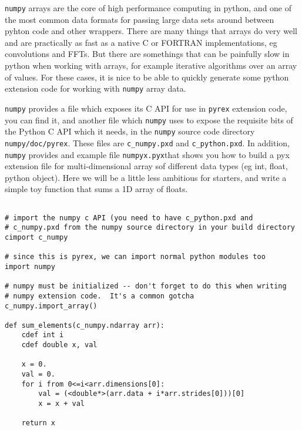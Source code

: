 \texttt{numpy} arrays are the core of high performance computing in
python, and one of the most common data formats for passing large data
sets around between pyhton code and other wrappers.  There are many
things that arrays do very well and are practically as fast as a
native C or FORTRAN implementations, eg convolutions and FFTs.  But
there are somethings that can be painfully slow in python when working
with arrays, for example iterative algorithms over an array of values.
For these cases, it is nice to be able to quickly generate some python
extension code for working with \texttt{numpy} array data.

\texttt{numpy} provides a file which exposes its C API for use in
\texttt{pyrex} extension code, you can find it, and another file which
\texttt{numpy} uses to expose the requisite bits of the Python C API
which it needs, in the \texttt{numpy} source code directory
\texttt{numpy/doc/pyrex}.  These files are \texttt{c\_numpy.pxd} and
\texttt{c\_python.pxd}.  In addition, \texttt{numpy} provides and
example file \texttt{numpyx.pyx}that shows you how to build a pyx
extension file for multi-dimensional array sof different data types
(eg int, float, python object).  Here we will be a little less
ambitious for starters, and write a simple toy function that sums a 1D
array of floats.

\begin{lstlisting}

# import the numpy c API (you need to have c_python.pxd and
# c_numpy.pxd from the numpy source directory in your build directory
cimport c_numpy

# since this is pyrex, we can import normal python modules too
import numpy

# numpy must be initialized -- don't forget to do this when writing
# numpy extension code.  It's a common gotcha
c_numpy.import_array()

def sum_elements(c_numpy.ndarray arr):
    cdef int i
    cdef double x, val

    x = 0.
    val = 0.
    for i from 0<=i<arr.dimensions[0]:
        val = (<double*>(arr.data + i*arr.strides[0]))[0]
        x = x + val

    return x

\end{lstlisting}

